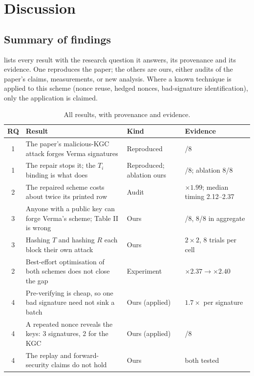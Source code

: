 \section{Discussion}\label{sec:discussion}

\subsection{Summary of findings}
 lists every result with the research question it answers, its provenance and its evidence. One reproduces the paper; the
others are ours, either audits of the paper's claims, measurements, or new analysis. Where a known
technique is applied to this scheme (nonce reuse, hedged nonces, bad-signature identification), only the
application is claimed.

\begin{table}[ht]
\centering\small
\caption{All results, with provenance and evidence.}\label{tab:findings}
\begin{tabularx}{\linewidth}{c>{\raggedright\arraybackslash}X>{\raggedright\arraybackslash}p{2.4cm}>{\raggedright\arraybackslash}p{3.7cm}}
\toprule
RQ & Result & Kind & Evidence \\
\midrule
1 & The paper's malicious-KGC attack forges Verma signatures & Reproduced & 8/8 \\
1 & The repair stops it; the $T_i$ binding is what does & Reproduced; ablation ours & 0/8; ablation 8/8 \\
2 & The repaired scheme costs about twice its printed row & Audit & $\times1.99$; median timing 2.12--2.37 \\
3 & Anyone with a public key can forge Verma's scheme; Table II is wrong & Ours & 8/8, 8/8 in aggregate \\
3 & Hashing $T$ and hashing $R$ each block their own attack & Ours & $2\times2$, 8 trials per cell \\
2 & Best-effort optimisation of both schemes does not close the gap & Experiment & $\times2.37\to\times2.40$ \\
4 & Pre-verifying is cheap, so one bad signature need not sink a batch & Ours (applied) & $1.7\times$ per signature \\
4 & A repeated nonce reveals the keys: 3 signatures, 2 for the KGC & Ours (applied) & 8/8 \\
4 & The replay and forward-security claims do not hold & Ours & both tested \\
\bottomrule
\end{tabularx}
\end{table}

